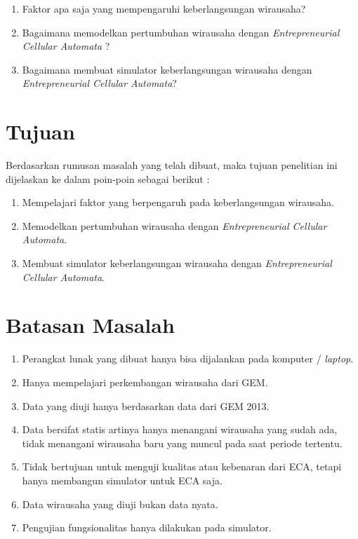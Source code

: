 \begin{enumerate}
	\item Faktor apa saja yang mempengaruhi keberlangsungan wirausaha?
	\item Bagaimana memodelkan pertumbuhan wirausaha dengan \textit{Entrepreneurial Cellular Automata} ?
	\item Bagaimana membuat simulator keberlangsungan wirausaha dengan \textit{Entrepreneurial Cellular Automata}?
\end{enumerate}



\section{Tujuan}
\label{sec:tujuan}
Berdasarkan rumusan masalah yang telah dibuat, maka tujuan penelitian ini dijelaskan ke dalam poin-poin sebagai berikut :


\begin{enumerate}
	\item Mempelajari faktor yang berpengaruh pada keberlangsungan wirausaha.
	\item Memodelkan pertumbuhan wirausaha dengan \textit{ Entrepreneurial Cellular Automata}.
	\item Membuat simulator keberlangsungan wirausaha dengan \textit{Entrepreneurial Cellular Automata}.
\end{enumerate}

\section{Batasan Masalah}
\label{sec:batasan}
\begin{enumerate}
	\item Perangkat lunak yang dibuat hanya bisa dijalankan pada komputer / \textit{laptop}.
	\item Hanya mempelajari perkembangan wirausaha dari GEM.
	\item Data yang diuji hanya berdasarkan data dari GEM 2013.
	\item Data bersifat statis artinya hanya menangani wirausaha yang sudah ada, tidak menangani wirausaha baru yang muncul pada saat periode tertentu. 
	\item Tidak bertujuan untuk menguji kualitas atau kebenaran dari ECA, tetapi hanya membangun simulator untuk ECA saja.
	\item Data wirausaha yang diuji bukan data nyata.
	\item Pengujian fungsionalitas hanya dilakukan pada simulator.
\end{enumerate}


